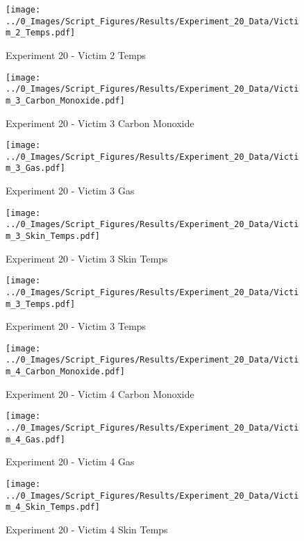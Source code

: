 	\begin{figure}[H]
		\centering
		\texttt{[image: ../0\_Images/Script\_Figures/Results/Experiment\_20\_Data/Victim\_2\_Temps.pdf]}
		\caption[]{Experiment 20 - Victim 2 Temps}
	\end{figure}
 
	\clearpage

	\begin{figure}[H]
		\centering
		\texttt{[image: ../0\_Images/Script\_Figures/Results/Experiment\_20\_Data/Victim\_3\_Carbon\_Monoxide.pdf]}
		\caption[]{Experiment 20 - Victim 3 Carbon Monoxide}
	\end{figure}
 

	\begin{figure}[H]
		\centering
		\texttt{[image: ../0\_Images/Script\_Figures/Results/Experiment\_20\_Data/Victim\_3\_Gas.pdf]}
		\caption[]{Experiment 20 - Victim 3 Gas}
	\end{figure}
 
	\clearpage

	\begin{figure}[H]
		\centering
		\texttt{[image: ../0\_Images/Script\_Figures/Results/Experiment\_20\_Data/Victim\_3\_Skin\_Temps.pdf]}
		\caption[]{Experiment 20 - Victim 3 Skin Temps}
	\end{figure}
 

	\begin{figure}[H]
		\centering
		\texttt{[image: ../0\_Images/Script\_Figures/Results/Experiment\_20\_Data/Victim\_3\_Temps.pdf]}
		\caption[]{Experiment 20 - Victim 3 Temps}
	\end{figure}
 
	\clearpage

	\begin{figure}[H]
		\centering
		\texttt{[image: ../0\_Images/Script\_Figures/Results/Experiment\_20\_Data/Victim\_4\_Carbon\_Monoxide.pdf]}
		\caption[]{Experiment 20 - Victim 4 Carbon Monoxide}
	\end{figure}
 

	\begin{figure}[H]
		\centering
		\texttt{[image: ../0\_Images/Script\_Figures/Results/Experiment\_20\_Data/Victim\_4\_Gas.pdf]}
		\caption[]{Experiment 20 - Victim 4 Gas}
	\end{figure}
 
	\clearpage

	\begin{figure}[H]
		\centering
		\texttt{[image: ../0\_Images/Script\_Figures/Results/Experiment\_20\_Data/Victim\_4\_Skin\_Temps.pdf]}
		\caption[]{Experiment 20 - Victim 4 Skin Temps}
	\end{figure}
 

